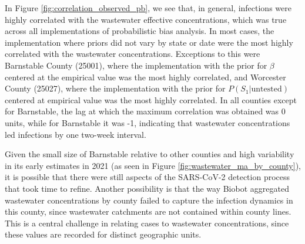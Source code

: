 \documentclass[12pt,twoside]{smiththesis}
\begin{document}
In Figure \ref{fig:correlation_observed_pb}, we see that, in general, infections were highly correlated with the wastewater effective concentrations, which was true across all implementations of probabilistic bias analysis. In most cases, the implementation where priors did not vary by state or date were the most highly correlated with the wastewater concentrations. Exceptions to this were Barnstable County (25001), where the implementation with the prior for \(\beta\) centered at the empirical value was the most highly correlated, and Worcester County (25027), where the implementation with the prior for \(P(S_1|\text{untested})\) centered at empirical value was the most highly correlated. In all counties except for Barnstable, the lag at which the maximum correlation was obtained was 0 units, while for Barnstable it was -1, indicating that wastewater concentrations led infections by one two-week interval.

Given the small size of Barnstable relative to other counties and high variability in its early estimates in 2021 (as seen in Figure \ref{fig:wastewater_ma_by_county}), it is possible that there were still aspects of the SARS-CoV-2 detection process that took time to refine. Another possibility is that the way Biobot aggregated wastewater concentrations by county failed to capture the infection dynamics in this county, since wastewater catchments are not contained within county lines. This is a central challenge in relating cases to wastewater concentrations, since these values are recorded for distinct geographic units.
\end{document}
